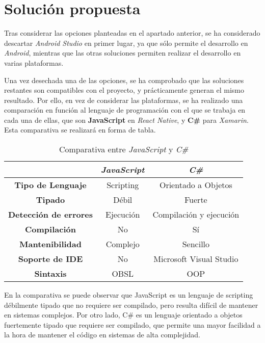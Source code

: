 
\section{Solución propuesta}
Tras considerar las opciones planteadas en el apartado anterior, se ha considerado descartar \textit{Android Studio} en 
primer lugar, ya que sólo permite el desarrollo en \textit{Android}, mientras que las otras soluciones permiten realizar 
el desarrollo en varias plataformas. \medskip

Una vez desechada una de las opciones, se ha comprobado que las soluciones restantes son compatibles con el proyecto, y 
prácticamente generan el mismo resultado. Por ello, en vez de considerar las plataformas, se ha realizado una comparación 
en función al lenguaje de programación con el que se trabaja en cada una de ellas, que son \textbf{JavaScript} en 
\textit{React Native}, y \textbf{C\#} para \textit{Xamarin}. Esta comparativa se realizará en forma de tabla.\bigskip

\begin{table}[htb]
\centering
\caption{Comparativa entre \textit{JavaScript} y \textit{C\#}}
\bigskip
\begin{tabular}{|c|c|c|}
    \hline
    & \textit{\textbf{JavaScript}} & \textbf{\textit{C\#}} \\ \hline \hline
    \textbf{Tipo de Lenguaje} & Scripting & Orientado a Objetos \\ \hline
    \textbf{Tipado} & Débil & Fuerte \\ \hline
    \textbf{Detección de errores} & Ejecución & Compilación y ejecución \\ \hline
    \textbf{Compilación} & No & Sí \\ \hline
    \textbf{Mantenibilidad} & Complejo & Sencillo \\ \hline
    \textbf{Soporte de IDE} & No & Microsoft Visual Studio \\ \hline
    \textbf{Sintaxis} & OBSL & OOP \\ \hline
\end{tabular}
\end{table}   

En la comparativa se puede observar que JavaScript es un lenguaje de scripting débilmente tipado que 
no requiere ser compilado, pero resulta difícil de mantener en sistemas complejos. Por otro lado, 
C\# es un lenguaje orientado a objetos fuertemente tipado que requiere ser compilado, que permite 
una mayor facilidad a la hora de mantener el código en sistemas de alta complejidad.\medskip

